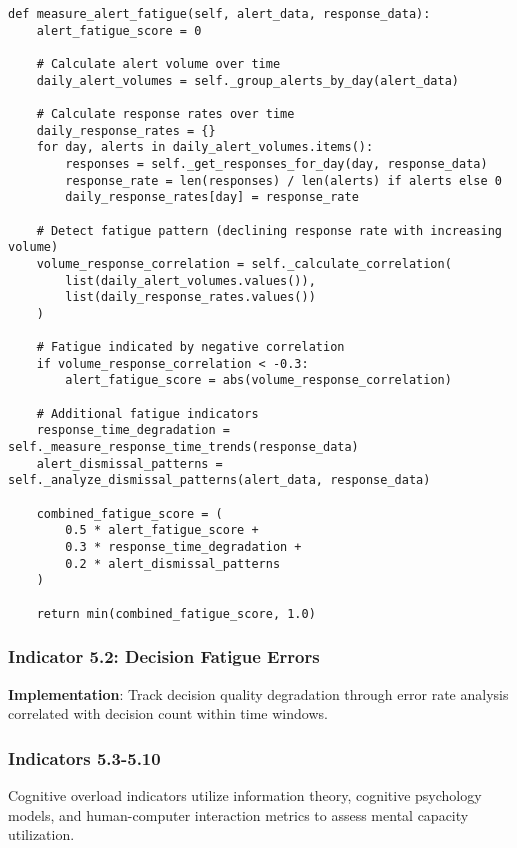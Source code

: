 \documentclass[11pt, onecolumn]{article}
\begin{document}
\begin{lstlisting}
def measure_alert_fatigue(self, alert_data, response_data):
    alert_fatigue_score = 0
    
    # Calculate alert volume over time
    daily_alert_volumes = self._group_alerts_by_day(alert_data)
    
    # Calculate response rates over time
    daily_response_rates = {}
    for day, alerts in daily_alert_volumes.items():
        responses = self._get_responses_for_day(day, response_data)
        response_rate = len(responses) / len(alerts) if alerts else 0
        daily_response_rates[day] = response_rate
    
    # Detect fatigue pattern (declining response rate with increasing volume)
    volume_response_correlation = self._calculate_correlation(
        list(daily_alert_volumes.values()),
        list(daily_response_rates.values())
    )
    
    # Fatigue indicated by negative correlation
    if volume_response_correlation < -0.3:
        alert_fatigue_score = abs(volume_response_correlation)
    
    # Additional fatigue indicators
    response_time_degradation = self._measure_response_time_trends(response_data)
    alert_dismissal_patterns = self._analyze_dismissal_patterns(alert_data, response_data)
    
    combined_fatigue_score = (
        0.5 * alert_fatigue_score +
        0.3 * response_time_degradation +
        0.2 * alert_dismissal_patterns
    )
    
    return min(combined_fatigue_score, 1.0)
\end{lstlisting}

\subsubsection{Indicator 5.2: Decision Fatigue Errors}

\textbf{Implementation}: Track decision quality degradation through error rate analysis correlated with decision count within time windows.

\subsubsection{Indicators 5.3-5.10}

Cognitive overload indicators utilize information theory, cognitive psychology models, and human-computer interaction metrics to assess mental capacity utilization.
\end{document}
